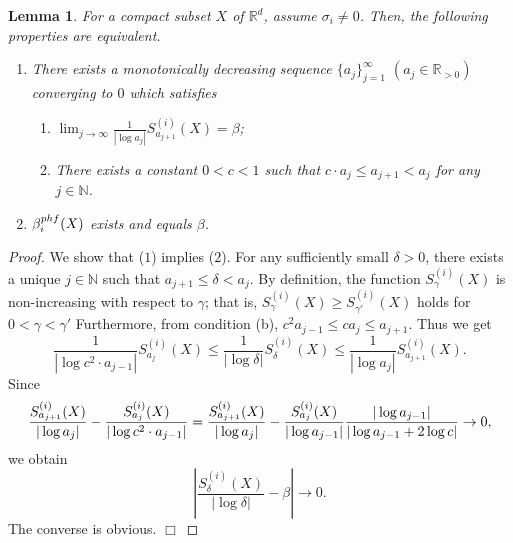 \documentclass[10pt,a4paper]{amsart}
\newtheorem{lem}{Lemma}
\def\qed{\hfill $\Box$}
\begin{document}
\begin{lem}
  For a compact subset $X$ of $\mathbb{R}^d$, assume $\sigma_i \neq 0$. 
  Then, the following properties are equivalent. 
  \begin{enumerate}
    \item There exists a monotonically decreasing sequence $\{a_j\}_{j=1}^\infty$ $(a_j \in \mathbb{R}_{>0})$ converging to $0$ which satisfies 
    \begin{enumerate}
      \item $\displaystyle \lim_{j \rightarrow \infty} \frac{1}{ \left| \log a_j\right|}S_{a_{j+1}}^{(i)}(X) = \beta$; 
      \item There exists a constant $0 < c < 1$ such that $c \cdot a_j \leq a_{j+1} < a_j$ for any $j\in \mathbb{N}$.
    \end{enumerate}
    \item $\beta_i ^{\rm phf} (X)$ exists and equals $\beta$.
  \end{enumerate}
  \label{lem: the existence of average ph fractal Betti number}
\end{lem}

\begin{proof}
    We show that ($1$) implies ($2$). 
    For any sufficiently small $\delta > 0$, there exists a unique $j \in \mathbb{N}$ such that $a_{j+1} \leq \delta < a_j$. 
    By definition, the function $S_{\gamma}^{(i)}(X)$ is non-increasing with respect to $\gamma$; that is, $S_{\gamma}^{(i)}(X) \geq S_{\gamma'}^{(i)}(X)$ holds for $0 < \gamma < \gamma'$
    Furthermore, from condition (b), $c^2 a_{j-1} \leq c a_j \leq a_{j+1}$.
    Thus we get 
    \begin{equation*}
        \frac{1}{ \left| \log c^2 \cdot a_{j-1}\right|}S_{a_{j}}^{(i)}(X) 
        \leq 
        \frac{1}{ \left| \log \delta \right|}S_{\delta}^{(i)}(X)
        \leq 
        \frac{1}{ \left| \log a_j\right|}S_{a_{j+1}}^{(i)}(X).
    \end{equation*}
    Since 
    \begin{equation*}
        \frac{S_{a_{j+1}}^{(i)}(X)}{|\log a_j|} - \frac{S_{a_{j}}^{(i)}(X)}{| \log c^2 \cdot a_{j-1}|} = 
        \frac{S_{a_{j+1}}^{(i)}(X)}{|\log a_j|} - \frac{S_{a_{j}}^{(i)}(X)}{|\log a_{j-1} |} \frac{|\log a_{j-1}|}{|\log a_{j-1} + 2 \log c|} \notag \\
        \to 0,
    \end{equation*}
    we obtain
    \begin{equation*}
        \left| \frac{S_\delta ^{(i)}(X)}{|\log \delta |} - \beta \right| \to 0.
    \end{equation*}
    \indent
    The converse is obvious. 
    \qed
\end{proof}
\end{document}
